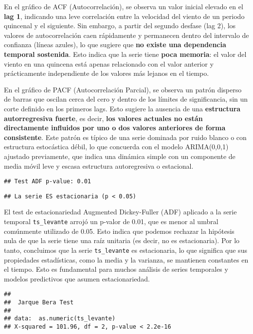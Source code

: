 \documentclass[
]{article}
\begin{document}
En el gráfico de ACF (Autocorrelación), se observa un valor inicial elevado en el \textbf{lag 1}, indicando una leve correlación entre la velocidad del viento de un periodo quincenal y el siguiente. Sin embargo, a partir del segundo desfase (lag 2), los valores de autocorrelación caen rápidamente y permanecen dentro del intervalo de confianza (líneas azules), lo que sugiere que \textbf{no existe una dependencia temporal sostenida}. Esto indica que la serie tiene \textbf{poca memoria}: el valor del viento en una quincena está apenas relacionado con el valor anterior y prácticamente independiente de los valores más lejanos en el tiempo.

En el gráfico de PACF (Autocorrelación Parcial), se observa un patrón disperso de barras que oscilan cerca del cero y dentro de los límites de significancia, sin un corte definido en los primeros lags. Esto sugiere la ausencia de una \textbf{estructura autorregresiva fuerte}, es decir, \textbf{los valores actuales no están directamente influidos por uno o dos valores anteriores de forma consistente}. Este patrón es típico de una serie dominada por ruido blanco o con estructura estocástica débil, lo que concuerda con el modelo ARIMA(0,0,1) ajustado previamente, que indica una dinámica simple con un componente de media móvil leve y escasa estructura autoregresiva o estacional.

\begin{verbatim}
## Test ADF p-value: 0.01
\end{verbatim}

\begin{verbatim}
## La serie ES estacionaria (p < 0.05)
\end{verbatim}

El test de estacionariedad Augmented Dickey-Fuller (ADF) aplicado a la serie temporal \texttt{ts\_levante} arrojó un p-valor de 0.01, que es menor al umbral comúnmente utilizado de 0.05. Esto indica que podemos rechazar la hipótesis nula de que la serie tiene una raíz unitaria (es decir, no es estacionaria). Por lo tanto, concluimos que la serie \texttt{ts\_levante} es estacionaria, lo que significa que sus propiedades estadísticas, como la media y la varianza, se mantienen constantes en el tiempo. Esto es fundamental para muchos análisis de series temporales y modelos predictivos que asumen estacionariedad.

\begin{verbatim}
## 
##  Jarque Bera Test
## 
## data:  as.numeric(ts_levante)
## X-squared = 101.96, df = 2, p-value < 2.2e-16
\end{verbatim}
\end{document}
